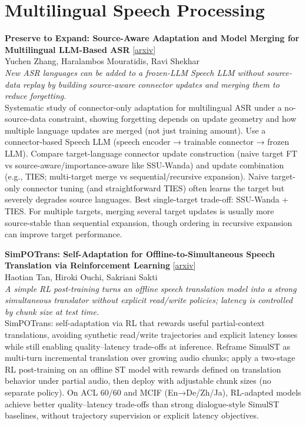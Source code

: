 \documentclass[12pt,letterpaper]{article}
\begin{document}
\medskip


\section*{Multilingual Speech Processing}

{\small\textbf{Preserve to Expand: Source-Aware Adaptation and Model Merging for Multilingual LLM-Based ASR}} {\scriptsize[\href{https://arxiv.org/abs/2610.35846}{arxiv}]}\\
{\scriptsize Yuchen Zhang, Haralambos Mouratidis, Ravi Shekhar}\\

{\small\textit{New ASR languages can be added to a frozen-LLM Speech LLM without source-data replay by building source-aware connector updates and merging them to reduce forgetting.}}\\[1pt]
{\footnotesize Systematic study of connector-only adaptation for multilingual ASR under a no-source-data constraint, showing forgetting depends on update geometry and how multiple language updates are merged (not just training amount). Use a connector-based Speech LLM (speech encoder → trainable connector → frozen LLM). Compare target-language connector update construction (naive target FT vs source-aware/importance-aware like SSU-Wanda) and update combination (e.g., TIES; multi-target merge vs sequential/recursive expansion). Naive target-only connector tuning (and straightforward TIES) often learns the target but severely degrades source languages. Best single-target trade-off: SSU-Wanda + TIES. For multiple targets, merging several target updates is usually more source-stable than sequential expansion, though ordering in recursive expansion can improve target performance.}

\medskip

{\small\textbf{SimPOTrans: Self-Adaptation for Offline-to-Simultaneous Speech Translation via Reinforcement Learning}} {\scriptsize[\href{https://arxiv.org/abs/2610.35042}{arxiv}]}\\
{\scriptsize Haotian Tan, Hiroki Ouchi, Sakriani Sakti}\\

{\small\textit{A simple RL post-training turns an offline speech translation model into a strong simultaneous translator without explicit read/write policies; latency is controlled by chunk size at test time.}}\\[1pt]
{\footnotesize SimPOTrans: self-adaptation via RL that rewards useful partial-context translations, avoiding synthetic read/write trajectories and explicit latency losses while still enabling quality--latency trade-offs at inference. Reframe SimulST as multi-turn incremental translation over growing audio chunks; apply a two-stage RL post-training on an offline ST model with rewards defined on translation behavior under partial audio, then deploy with adjustable chunk sizes (no separate policy). On ACL 60/60 and MCIF (En→De/Zh/Ja), RL-adapted models achieve better quality--latency trade-offs than strong dialogue-style SimulST baselines, without trajectory supervision or explicit latency objectives.}
\end{document}
